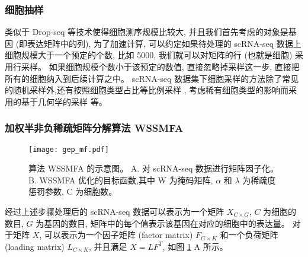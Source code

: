 \subsubsection{细胞抽样}
类似于 Drop-seq 等技术使得细胞测序规模比较大, 并且我们首先考虑的对象是基因 (即表达矩阵中的列), 
为了加速计算, 可以约定如果待处理的 scRNA-seq 数据上细胞规模大于一个预定的个数, 比如 5000,
我们就可以对矩阵的行 (也就是细胞) 采用行采样。
如果细胞规模个数小于该预定的数值, 直接忽略掉采样这一步, 
直接把所有的细胞纳入到后续计算之中。
 scRNA-seq 数据集下细胞采样的方法除了常见的随机采样外,还有按照细胞类型占比等比例采样 ,
考虑稀有细胞类型的影响而采用的基于几何学的采样  等。

\subsubsection{加权半非负稀疏矩阵分解算法 WSSMFA}

\begin{figure}[!htbp]
    \centering
    \texttt{[image: gep\_mf.pdf]}
    \caption{
        算法 WSSMFA 的示意图。
        A. 对 scRNA-seq 数据进行矩阵因子化。
        B. WSSMFA 优化的目标函数,其中 W 为掩码矩阵, $\alpha$ 和 $\lambda$ 为稀疏度惩罚参数, C 为细胞数。
    }
    \label{fig:gep-mf}
\end{figure}

经过上述步骤处理后的 scRNA-seq 数据可以表示为一个矩阵 $X_{C \times G}$, $C$ 为细胞的数目, $G$ 为基因的数目, 
矩阵中的每个值表示该基因在对应的细胞中的表达量。
对于矩阵 $X$, 可以表示为一个因子矩阵 (factor matrix) $F_{G \times K}$ 和一个负荷矩阵 (loading matrix) $L_{C \times K}$,
并且满足 $X=LF^T$, 如图 \ref{fig:gep-mf} A 所示。 

